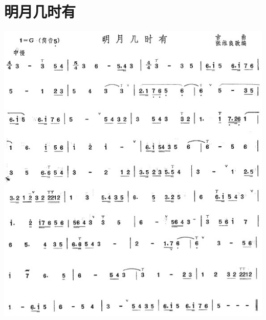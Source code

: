 \documentclass[cn,pad,twocol]{elegantbook}
\begin{document}
\section{明月几时有}
    \includegraphics[width=\textwidth]{rpi400/20201230明月几时有.jpg}
\end{document}
